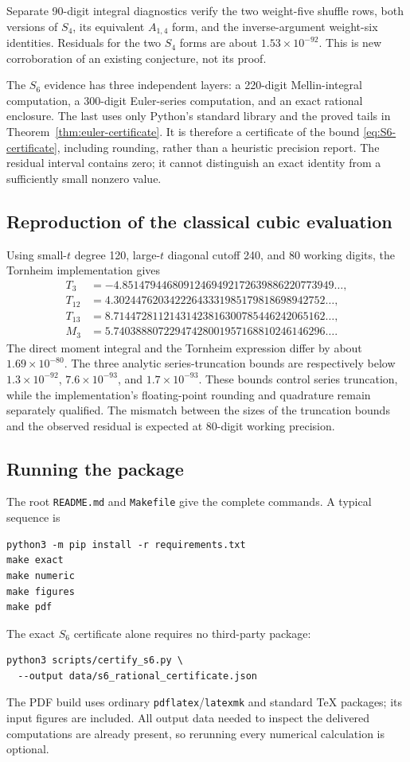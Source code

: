 Separate 90-digit integral diagnostics verify the two weight-five
shuffle rows, both versions of \(S_4\), its equivalent \(A_{1,4}\)
form, and the inverse-argument weight-six identities. Residuals for
the two \(S_4\) forms are about \(1.53\times10^{-92}\).
This is new corroboration of an existing conjecture, not its proof.

The \(S_6\) evidence has three independent layers: a 220-digit
Mellin-integral computation, a 300-digit Euler-series computation,
and an exact rational enclosure. The last uses only Python's
standard library and the proved tails in
Theorem~\ref{thm:euler-certificate}. It is therefore a certificate of
the bound \eqref{eq:S6-certificate}, including rounding, rather than
a heuristic precision report. The residual interval contains zero;
it cannot distinguish an exact identity from a sufficiently small
nonzero value.

\subsection{Reproduction of the classical cubic evaluation}

Using small-\(t\) degree 120, large-\(t\) diagonal cutoff 240, and
80 working digits, the Tornheim implementation gives
\begin{align*}
 T_3&=-4.85147944680912469492172639886220773949\ldots,\\
 T_{12}&=4.30244762034222643331985179818698942752\ldots,\\
 T_{13}&=8.71447281121431423816300785446242065162\ldots,\\
 M_3&=5.74038880722947428001957168810246146296\ldots.
\end{align*}
The direct moment integral and the Tornheim expression differ by
about \(1.69\times10^{-80}\).
The three analytic series-truncation bounds are respectively below
\(1.3\times10^{-92}\), \(7.6\times10^{-93}\), and
\(1.7\times10^{-93}\).
These bounds control series truncation, while the implementation's
floating-point rounding and quadrature remain separately qualified.
The mismatch between the sizes of the truncation bounds and the
observed residual is expected at 80-digit working precision.

\subsection{Running the package}

The root \texttt{README.md} and \texttt{Makefile} give the complete
commands. A typical sequence is
\begin{verbatim}
python3 -m pip install -r requirements.txt
make exact
make numeric
make figures
make pdf
\end{verbatim}
The exact \(S_6\) certificate alone requires no third-party package:
\begin{verbatim}
python3 scripts/certify_s6.py \
  --output data/s6_rational_certificate.json
\end{verbatim}
The PDF build uses ordinary \texttt{pdflatex}/\texttt{latexmk} and
standard TeX packages; its input figures are included.
All output data needed to inspect the delivered computations are
already present, so rerunning every numerical calculation is optional.

